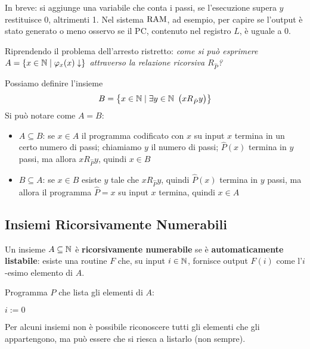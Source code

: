 In breve: si aggiunge una variabile che conta i passi, se l'esecuzione supera $y$ restituisce 0, altrimenti 1. Nel sistema $\text{RAM}$, ad esempio, per capire se l'output è stato generato o meno osservo se il PC, contenuto nel registro $L$, è uguale a 0.

Riprendendo il problema dell'arresto ristretto: \textit{come si può esprimere $A = \left\{x \in \mathbb{N} \mid \varphi_x (x) \downarrow\right\}$ attraverso la relazione ricorsiva $R_{\hat{P}}$?}

Possiamo definire l'insieme
$$ B = \left\{x \in \N \mid \exists y \in \N \ \left(xR_{\hat{P}}y\right)\right\} $$
Si può notare come $A = B$:
\begin{itemize}
	\item $A \subseteq B$: se $x \in A$ il programma codificato con $x$ su input $x$ termina in un certo numero di passi; chiamiamo $y$ il numero di passi; $\hat{P}(x)$ termina in $y$ passi, ma allora $xR_{\hat{P}} y$, quindi $x \in B$
	
    \item $B \subseteq A$: se $x \in B$ esiste $y$ tale che $xR_{\hat{P}}y$, quindi $\hat{P}(x)$ termina in $y$ passi, ma allora il programma $\hat{P} = x$ su input $x$ termina, quindi $x \in A$
\end{itemize}

\subsection{Insiemi Ricorsivamente Numerabili}

Un insieme $A \subseteq \mathbb{N}$ è \textbf{ricorsivamente numerabile} se è \textbf{automaticamente listabile}: esiste una routine $F$ che, su input $i \in \mathbb{N}$, fornisce output $F(i)$ come l'$i$-esimo elemento di $A$.

Programma $P$ che lista gli elementi di $A$:

\vspace{0.5em}
\hspace{4em}
\begin{minipage}{.3\textwidth}
	\begin{tcolorbox}[
		colback=white,
		sharp corners,
		boxrule=.3mm,
		left=20pt
		]
		\begin{algorithm}[H]
			\SetAlgoNoEnd
			$i:=0$ \\
		\end{algorithm}
	\end{tcolorbox}
\end{minipage}
\hspace{2em}
\begin{minipage}{.55\textwidth}
	Per alcuni insiemi non è possibile riconoscere tutti gli elementi che gli appartengono, ma può essere che si riesca a listarlo (non sempre).
\end{minipage}
\vspace{0.1em}

